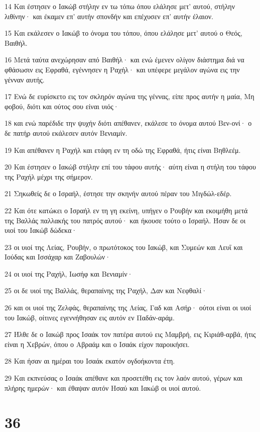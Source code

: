 \par 14 Και έστησεν ο Ιακώβ στήλην εν τω τόπω όπου ελάλησε μετ' αυτού, στήλην λιθίνην· και έκαμεν επ' αυτήν σπονδήν και επέχυσεν επ' αυτήν έλαιον.
\par 15 Και εκάλεσεν ο Ιακώβ το όνομα του τόπου, όπου ελάλησε μετ' αυτού ο Θεός, Βαιθήλ.
\par 16 Μετά ταύτα ανεχώρησαν από Βαιθήλ· και ενώ έμενεν ολίγον διάστημα διά να φθάσωσιν εις Εφραθά, εγέννησεν η Ραχήλ· και υπέφερε μεγάλον αγώνα εις την γένναν αυτής.
\par 17 Ενώ δε ευρίσκετο εις τον σκληρόν αγώνα της γέννας, είπε προς αυτήν η μαία, Μη φοβού, διότι και ούτος σου είναι υιός·
\par 18 και ενώ παρέδιδε την ψυχήν διότι απέθανεν, εκάλεσε το όνομα αυτού Βεν-ονί· ο δε πατήρ αυτού εκάλεσεν αυτόν Βενιαμίν.
\par 19 Και απέθανεν η Ραχήλ και ετάφη εν τη οδώ της Εφραθά, ήτις είναι Βηθλεέμ.
\par 20 Και έστησεν ο Ιακώβ στήλην επί του τάφου αυτής· αύτη είναι η στήλη του τάφου της Ραχήλ μέχρι της σήμερον.
\par 21 Σηκωθείς δε ο Ισραήλ, έστησε την σκηνήν αυτού πέραν του Μιγδώλ-εδέρ.
\par 22 Και ότε κατώκει ο Ισραήλ εν τη γη εκείνη, υπήγεν ο Ρουβήν και εκοιμήθη μετά της Βαλλάς παλλακής του πατρός αυτού· και ήκουσε τούτο ο Ισραήλ. Ήσαν δε οι υιοί του Ιακώβ δώδεκα·
\par 23 οι υιοί της Λείας, Ρουβήν, ο πρωτότοκος του Ιακώβ, και Συμεών και Λευΐ και Ιούδας και Ισσάχαρ και Ζαβουλών·
\par 24 οι υιοί της Ραχήλ, Ιωσήφ και Βενιαμίν·
\par 25 οι δε υιοί της Βαλλάς, θεραπαίνης της Ραχήλ, Δαν και Νεφθαλί·
\par 26 και οι υιοί της Ζελφάς, θεραπαίνης της Λείας, Γαδ και Ασήρ· ούτοι είναι οι υιοί του Ιακώβ, οίτινες εγεννήθησαν εις αυτόν εν Παδάν-αράμ.
\par 27 Ήλθε δε ο Ιακώβ προς Ισαάκ τον πατέρα αυτού εις Μαμβρή, εις Κιριάθ-αρβά, ήτις είναι η Χεβρών, όπου ο Αβραάμ και ο Ισαάκ είχον παροικήσει.
\par 28 Και ήσαν αι ημέραι του Ισαάκ εκατόν ογδοήκοντα έτη.
\par 29 Και εκπνεύσας ο Ισαάκ απέθανε και προσετέθη εις τον λαόν αυτού, γέρων και πλήρης ημερών· και έθαψαν αυτόν Ησαύ και Ιακώβ οι υιοί αυτού.

\chapter{36}

